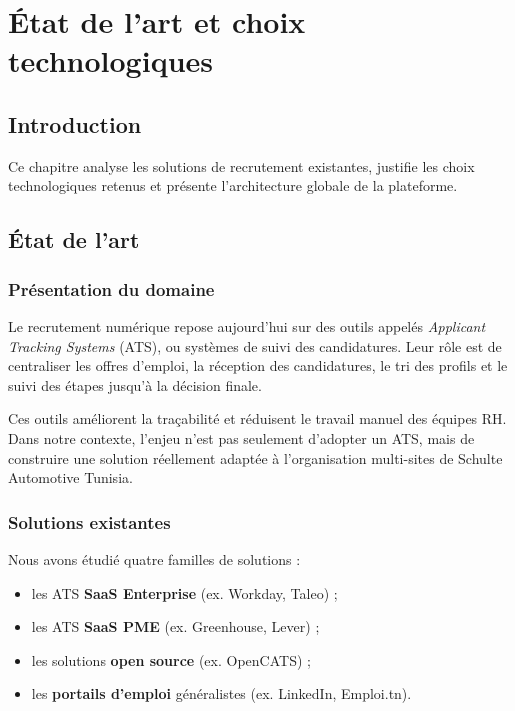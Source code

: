 
\chapter{État de l'art et choix technologiques}
\graphicspath{{Isipfe/Figures/}{diagramms/}}

\section*{Introduction}

Ce chapitre analyse les solutions de recrutement existantes, justifie les
choix technologiques retenus et présente l'architecture globale de la
plateforme.

\section{État de l'art}

\subsection{Présentation du domaine}

Le recrutement numérique repose aujourd'hui sur des outils appelés
\textit{Applicant Tracking Systems} (ATS), ou systèmes de suivi des
candidatures. Leur rôle est de centraliser les offres d'emploi, la
réception des candidatures, le tri des profils et le suivi des étapes
jusqu'à la décision finale.

Ces outils améliorent la traçabilité et réduisent le travail manuel des
équipes RH. Dans notre contexte, l'enjeu n'est pas seulement d'adopter un
ATS, mais de construire une solution réellement adaptée à l'organisation
multi-sites de Schulte Automotive Tunisia.

\subsection{Solutions existantes}

Nous avons étudié quatre familles de solutions :
\begin{itemize}
    \item les ATS \textbf{SaaS Enterprise} (ex. Workday, Taleo) ;
    \item les ATS \textbf{SaaS PME} (ex. Greenhouse, Lever) ;
    \item les solutions \textbf{open source} (ex. OpenCATS) ;
    \item les \textbf{portails d'emploi} généralistes (ex. LinkedIn,
    Emploi.tn).
\end{itemize}

